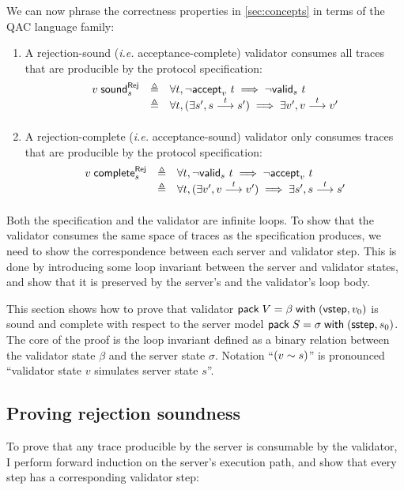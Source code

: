 We can now phrase the correctness properties in \autoref{sec:concepts} in terms
of the QAC language family:
\begin{enumerate}
  \item A rejection-sound ({\it i.e.} acceptance-complete) validator consumes
    all traces that are producible by the protocol specification:
    \[\begin{array}{lrl}
      \rejSound v s&\triangleq&\forall t,\rejects v t\implies\invalid s t\\
      &\triangleq&\forall t,(\exists s',\behaves s t s')\implies\exists v',\behaves v t v'
    \end{array}\]
  \item A rejection-complete ({\it i.e.} acceptance-sound) validator only
    consumes traces that are producible by the protocol specification:
    \[\begin{array}{lrl}
      \rejComplete v s&\triangleq&\forall t,\invalid s t\implies\rejects v t\\
      &\triangleq&\forall t,(\exists v',\behaves v t v')\implies\exists s',\behaves s t s'
    \end{array}\]
\end{enumerate}

Both the specification and the validator are infinite loops.  To show that the
validator consumes the same space of traces as the specification produces, we
need to show the correspondence between each server and validator step.  This is
done by introducing some loop invariant between the server and validator states,
and show that it is preserved by the server's and the validator's loop body.

This section shows how to prove that validator $\mathsf{pack}\;V=\beta\;\mathsf{with}\;(\mathsf{vstep},v_0)$
is sound and complete with respect to the server model
$\mathsf{pack}\;S=\sigma\;\mathsf{with}\;(\mathsf{sstep},s_0)$.  The core of the proof is the loop invariant
defined as a binary relation between the validator state $\beta$ and the server
state $\sigma$.  Notation ``$(v\sim s)$'' is pronounced ``validator state
$v$ simulates server state $s$''.

\subsection{Proving rejection soundness}
\label{sec:qac-soundness}
To prove that any trace producible by the server is consumable by the validator,
I perform forward induction on the server's execution path, and show that every
step has a corresponding validator step:

